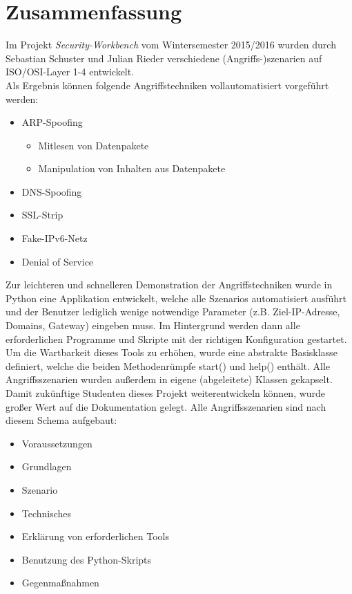 
\chapter{Zusammenfassung}

Im Projekt \textit{Security-Workbench} vom Wintersemester 2015/2016 wurden durch Sebastian Schuster und Julian Rieder verschiedene (Angriffs-)szenarien auf ISO/OSI-Layer 1-4 entwickelt.\\

Als Ergebnis können folgende Angriffstechniken vollautomatisiert vorgeführt werden:
\begin{itemize}
\item ARP-Spoofing
	\begin{itemize}
		\item Mitlesen von Datenpakete
		\item Manipulation von Inhalten aus Datenpakete
	\end{itemize}
\item DNS-Spoofing
\item SSL-Strip
\item Fake-IPv6-Netz
\item Denial of Service
\end{itemize}


Zur leichteren und schnelleren Demonstration der Angriffstechniken wurde in Python eine Applikation entwickelt, welche alle Szenarios automatisiert ausführt und der Benutzer lediglich wenige notwendige Parameter (z.B. Ziel-IP-Adresse, Domains, Gateway) eingeben muss. Im Hintergrund werden dann alle erforderlichen Programme und Skripte mit der richtigen Konfiguration gestartet.\\

Um die Wartbarkeit dieses Tools zu erhöhen, wurde eine abstrakte Basisklasse definiert, welche die beiden Methodenrümpfe start() und help() enthält. Alle Angriffsszenarien wurden
außerdem in eigene (abgeleitete) Klassen gekapselt. \\

Damit zukünftige Studenten dieses Projekt weiterentwickeln können, wurde großer Wert auf die Dokumentation gelegt. Alle Angriffsszenarien sind nach diesem
Schema aufgebaut:

\begin{itemize}
\item Voraussetzungen
\item Grundlagen
\item Szenario
\item Technisches
\item Erklärung von erforderlichen Tools
\item Benutzung des Python-Skripts
\item Gegenmaßnahmen
\end{itemize}
